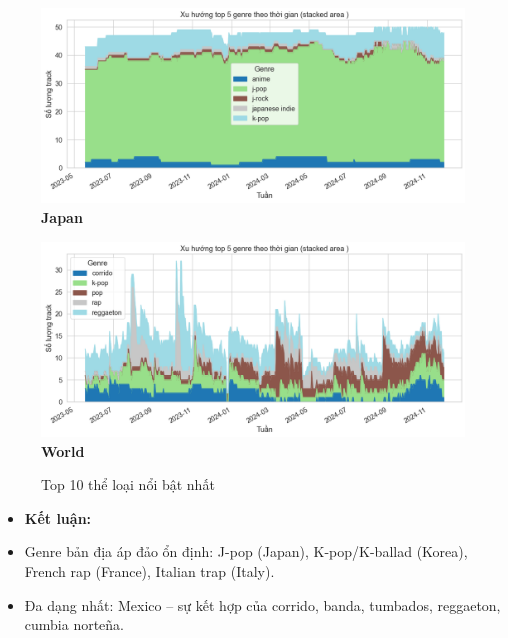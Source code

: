 \begin{itemize}
\begin{figure}[H]
        \begin{minipage}{0.45\textwidth}
            \centering
            \includegraphics[width=\linewidth]{../graphics/data_top50/figure/25/EDA_japan.png}
            \\[4pt] {\small \textbf{Japan}}
        \end{minipage}
        \hfill
        \begin{minipage}{0.45\textwidth}
            \centering
            \includegraphics[width=\linewidth]{../graphics/data_top50/figure/25/EDA_world.png}
            \\[4pt] {\small \textbf{World}}
        \end{minipage}

        \caption{Top 10 thể loại nổi bật nhất}
    \end{figure}

    \begin{itemize}
        \item \textbf{Kết luận:}
        \item Genre bản địa áp đảo ổn định: J-pop (Japan), K-pop/K-ballad (Korea), French rap (France), Italian trap (Italy).
        \item Đa dạng nhất: Mexico – sự kết hợp của corrido, banda, tumbados, reggaeton, cumbia norteña.


\end{itemize}
\end{itemize}

